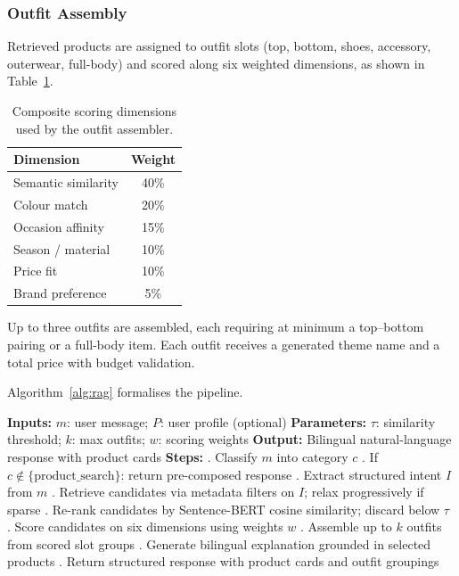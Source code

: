 \subsubsection{Outfit Assembly}

Retrieved products are assigned to outfit slots (top, bottom, shoes, accessory, outerwear, full-body) and scored along six weighted dimensions, as shown in Table~\ref{tab:scoring}.

\begin{table}[H]
\caption{Composite scoring dimensions used by the outfit assembler.}
\label{tab:scoring}
\centering
\begin{tabular}{l c}
\toprule
\textbf{Dimension} & \textbf{Weight} \\
\midrule
Semantic similarity & 40\% \\
Colour match & 20\% \\
Occasion affinity & 15\% \\
Season / material & 10\% \\
Price fit & 10\% \\
Brand preference & 5\% \\
\bottomrule
\end{tabular}
\end{table}

Up to three outfits are assembled, each requiring at minimum a top--bottom pairing or a full-body item. Each outfit receives a generated theme name and a total price with budget validation.

Algorithm~\ref{alg:rag} formalises the pipeline.

\begin{algorithm}[H]
\caption{RAG Fashion Assistant Pipeline}
\label{alg:rag}
\begin{algorithmic}[1]
\State \textbf{Inputs:}
\State \hspace{1em} $m$: user message; $P$: user profile (optional)
\State \textbf{Parameters:}
\State \hspace{1em} $\tau$: similarity threshold; $k$: max outfits; $w$: scoring weights
\State \textbf{Output:}
\State \hspace{1em} Bilingual natural-language response with product cards
\State \textbf{Steps:}
. Classify $m$ into category $c$
. If $c \notin \{\text{product\_search}\}$: return pre-composed response
. Extract structured intent $I$ from $m$
. Retrieve candidates via metadata filters on $I$; relax progressively if sparse
. Re-rank candidates by Sentence-BERT cosine similarity; discard below $\tau$
. Score candidates on six dimensions using weights $w$
. Assemble up to $k$ outfits from scored slot groups
. Generate bilingual explanation grounded in selected products
. Return structured response with product cards and outfit groupings
\end{algorithmic}
\end{algorithm}
